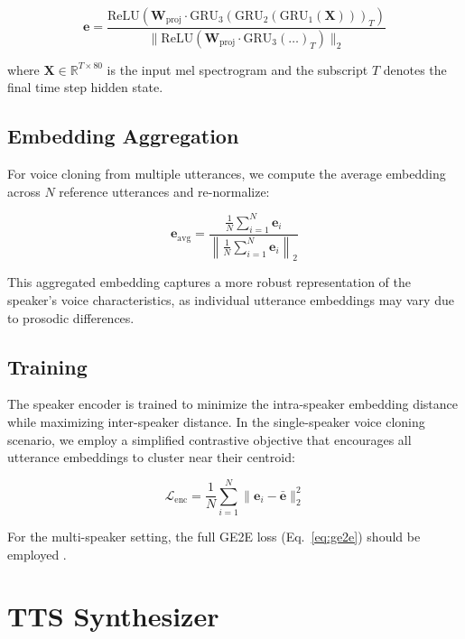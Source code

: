 \documentclass[conference]{IEEEtran}
\begin{document}
\begin{equation}
\mathbf{e} = \frac{\text{ReLU}(\mathbf{W}_{\text{proj}} \cdot \text{GRU}_3(\text{GRU}_2(\text{GRU}_1(\mathbf{X})))_T)}{\|\text{ReLU}(\mathbf{W}_{\text{proj}} \cdot \text{GRU}_3(\ldots)_T)\|_2}
\label{eq:speaker_enc}
\end{equation}

where $\mathbf{X} \in \mathbb{R}^{T \times 80}$ is the input mel spectrogram and the subscript $T$ denotes the final time step hidden state.

\subsection{Embedding Aggregation}

For voice cloning from multiple utterances, we compute the average embedding across $N$ reference utterances and re-normalize:

\begin{equation}
\mathbf{e}_{\text{avg}} = \frac{\frac{1}{N}\sum_{i=1}^{N} \mathbf{e}_i}{\left\|\frac{1}{N}\sum_{i=1}^{N} \mathbf{e}_i\right\|_2}
\end{equation}

This aggregated embedding captures a more robust representation of the speaker's voice characteristics, as individual utterance embeddings may vary due to prosodic differences.

\subsection{Training}

The speaker encoder is trained to minimize the intra-speaker embedding distance while maximizing inter-speaker distance. In the single-speaker voice cloning scenario, we employ a simplified contrastive objective that encourages all utterance embeddings to cluster near their centroid:

\begin{equation}
\mathcal{L}_{\text{enc}} = \frac{1}{N} \sum_{i=1}^{N} \|\mathbf{e}_i - \bar{\mathbf{e}}\|_2^2
\end{equation}

For the multi-speaker setting, the full GE2E loss (Eq.~\ref{eq:ge2e}) should be employed \cite{wan2018generalized}.

\section{TTS Synthesizer}
\end{document}
